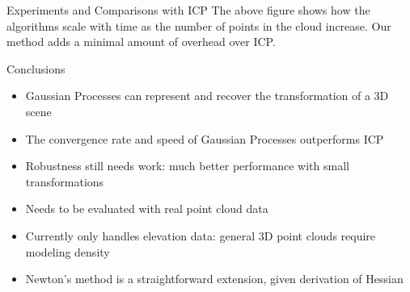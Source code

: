 \documentclass[final]{beamer}
\begin{document}
\begin{frame}{}
\begin{textblock}{27}
\begin{block}{Experiments and Comparisons with ICP}
The above figure shows how the algorithms scale with time as the number of points in the cloud increase. Our method adds a minimal amount of overhead over ICP.

\end{block}



\begin{block}{Conclusions}
\begin{itemize}
\item Gaussian Processes can represent and recover the transformation of a 3D scene
\item The convergence rate and speed of Gaussian Processes outperforms ICP
\item Robustness still needs work: much better performance with small transformations
\item Needs to be evaluated with real point cloud data
\item Currently only handles elevation data: general 3D point clouds require modeling density
\item Newton's method is a straightforward extension, given derivation of Hessian
\end{itemize}
\end{block}


\end{textblock}

\end{frame}
\end{document}
